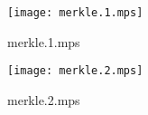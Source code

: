 \documentclass[letterpaper,10pt]{article}
\begin{document}
\begin{figure}
    \centering
    \texttt{[image: merkle.1.mps]}
    \caption{merkle.1.mps}
\end{figure}

\begin{figure}
    \centering
    \texttt{[image: merkle.2.mps]}
    \caption{merkle.2.mps}
\end{figure}
\end{document}

